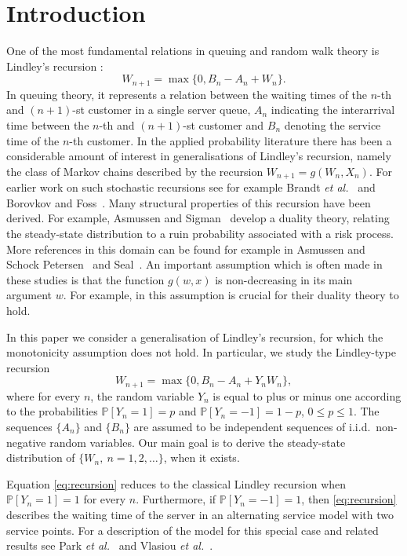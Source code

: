 \documentclass[reqno, 11pt, a4paper]{article}
\theoremstyle{plain}
\theoremstyle{remark}
\numberwithin{equation}{section}
\begin{document}
\section{Introduction}\label{s:intro}
One of the most fundamental relations in queuing and random walk theory is Lindley's recursion \cite{lindley52}:
\begin{equation}\label{eq:classic}
 W_{n+1}=\max\{0, B_n-A_n+W_n\}.
\end{equation}
In queuing theory, it represents a relation between the waiting times of the $n$-th and $(n+1)$-st customer in a single server queue, $A_n$ indicating the interarrival time between the $n$-th and $(n+1)$-st customer and $B_n$ denoting the service time of the $n$-th customer. In the applied probability literature there has been a considerable amount of interest in generalisations of Lindley's recursion, namely the class of Markov chains described by the recursion $W_{n+1}=g(W_n,X_n)$. For earlier work on such stochastic recursions see for example Brandt {\em et al.}~\cite{brandt-SSM} and Borovkov and Foss~\cite{borovkov92}. Many structural properties of this recursion have been derived. For example, Asmussen and Sigman~\cite{asmussen96a} develop a duality theory, relating the steady-state distribution to a ruin probability associated with a risk process. More references in this domain can be found for example in Asmussen and Schock Petersen~\cite{asmussen89} and Seal~\cite{seal72}. An important assumption which is often made in these studies is that the function $g(w,x)$ is non-decreasing in its main argument $w$. For example, in \cite{asmussen96a} this assumption is crucial for their duality theory to hold.

In this paper we consider a generalisation of Lindley's recursion, for which the monotonicity assumption does not hold. In particular, we study the Lindley-type recursion
\begin{equation}\label{eq:recursion}
 W_{n+1}=\max\{0, B_n-A_n+Y_nW_n\},
\end{equation}
where for every $n$, the random variable $Y_n$ is equal to plus or minus one according to the probabilities ${\mathbb{P}}[Y_n=1]=p$ and ${\mathbb{P}}[Y_n=-1]=1-p$, $0 \leqslant p\leqslant 1$. The sequences $\{A_n\}$ and $\{B_n\}$ are assumed to be independent sequences of i.i.d.\ non-negative random variables. Our main goal is to derive the steady-state distribution of $\{W_n,~n=1,2,\dots\}$, when it exists.

Equation \eqref{eq:recursion} reduces to the classical Lindley recursion \cite{lindley52} when ${\mathbb{P}}[Y_n=1]=1$ for every $n$. Furthermore, if ${\mathbb{P}}[Y_n=-1]=1$, then \eqref{eq:recursion} describes the waiting time of the server in an alternating service model with two service points. For a description of the model for this special case and related results see Park {\em et al.}~\cite{park03} and Vlasiou {\em et al.}~\cite{vlasiou05a, vlasiou05, vlasiou05b, vlasiou04}.
\end{document}
